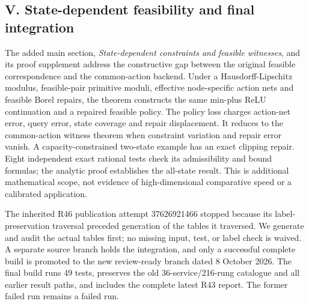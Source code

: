 \documentclass[ecta,nameyear,draft]{econsocart}
\begin{document}
\hypertarget{v-state-dependent-feasibility-and-final-integration}{%
\subsection{V. State-dependent feasibility and final
integration}\label{v-state-dependent-feasibility-and-final-integration}}

The added main section, \emph{State-dependent constraints and feasible
witnesses}, and its proof supplement address the constructive gap
between the original feasible correspondence and the common-action
backend. Under a Hausdorff-Lipschitz modulus, feasible-pair primitive
moduli, effective node-specific action nets and feasible Borel repairs,
the theorem constructs the same min-plus ReLU continuation and a
repaired feasible policy. The policy loss charges action-net error,
query error, state coverage and repair displacement. It reduces to the
common-action witness theorem when constraint variation and repair error
vanish. A capacity-constrained two-state example has an exact clipping
repair. Eight independent exact rational tests check its admissibility
and bound formulas; the analytic proof establishes the all-state result.
This is additional mathematical scope, not evidence of high-dimensional
comparative speed or a calibrated application.

The inherited R46 publication attempt 37626921466 stopped because its
label-preservation traversal preceded generation of the tables it
traversed. We generate and audit the actual tables first; no missing
input, test, or label check is waived. A separate source branch holds
the integration, and only a successful complete build is promoted to the
new review-ready branch dated 8 October 2026. The final build runs 49
tests, preserves the old 36-service/216-rung catalogue and all earlier
result paths, and includes the complete latest R43 report. The former
failed run remains a failed run.
\end{document}
